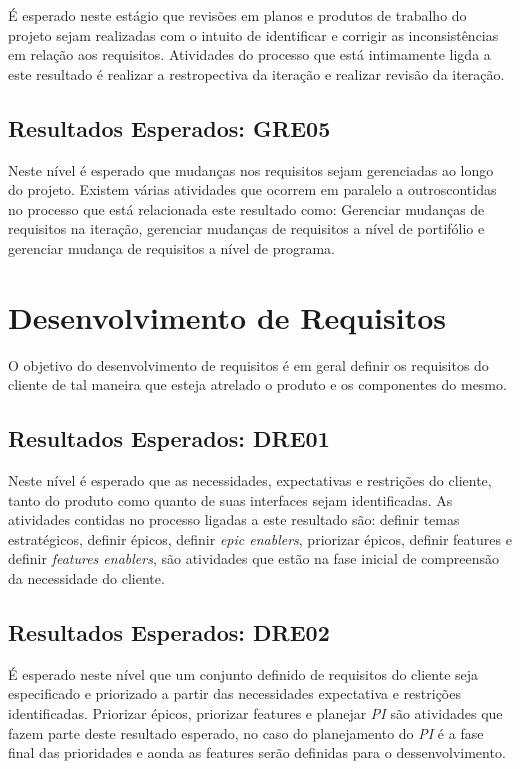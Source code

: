 	É esperado neste estágio que revisões em planos e produtos de trabalho do projeto sejam realizadas com o intuito de identificar e corrigir as inconsistências em relação aos requisitos. Atividades do processo que está intimamente ligda a este resultado é realizar a restropectiva da iteração e realizar revisão da iteração.

	\subsection{Resultados Esperados: GRE05}

	Neste nível é esperado que mudanças nos requisitos sejam gerenciadas ao longo do projeto. Existem várias atividades que ocorrem em paralelo a outroscontidas no processo que está relacionada este resultado como: Gerenciar mudanças de requisitos na iteração, gerenciar mudanças de requisitos a nível de portifólio e gerenciar mudança de requisitos a nível de programa.

	\section{Desenvolvimento de Requisitos}

		O objetivo do desenvolvimento de requisitos é em geral definir os requisitos do cliente de tal maneira que esteja atrelado o produto e os componentes do mesmo.

	\subsection{Resultados Esperados: DRE01}
	Neste nível é esperado que as necessidades, expectativas e restrições do cliente, tanto do produto como quanto de suas interfaces sejam identificadas. As atividades contidas no processo ligadas a este resultado são: definir temas estratégicos, definir épicos, definir {\itshape epic enablers}, priorizar épicos, definir features e definir {\itshape features enablers}, são atividades que estão na fase inicial de compreensão da necessidade do cliente.

	\subsection{Resultados Esperados: DRE02}
	É esperado neste nível que um conjunto definido de requisitos do cliente seja especificado e priorizado a partir das necessidades expectativa e restrições identificadas. Priorizar épicos, priorizar features e planejar {\itshape PI} são atividades que fazem parte deste resultado esperado, no caso do planejamento do {\itshape PI} é a fase final das prioridades e aonda as features serão definidas para o dessenvolvimento.

